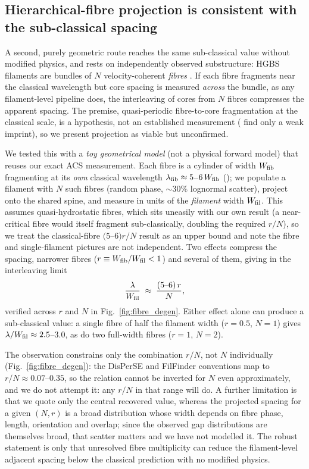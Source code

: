 \documentclass[usenatbib,twoside,twocolumn]{mnras}
\begin{document}
\subsection{Hierarchical-fibre projection is consistent with the sub-classical spacing}
\label{sec:fibre_projection}

A second, purely geometric route reaches the same sub-classical value without modified physics, and rests on independently observed substructure: HGBS filaments are bundles of $N$ velocity-coherent \emph{fibres} \citep{Hacar2013,Hacar2018,Yang2024}. If each fibre fragments near the classical wavelength but core spacing is measured \emph{across} the bundle, as any filament-level pipeline does, the interleaving of cores from $N$ fibres compresses the apparent spacing. The premise, quasi-periodic fibre-to-core fragmentation at the classical scale, is a hypothesis, not an established measurement (\citealt{Yang2024} find only a weak imprint), so we present projection as viable but unconfirmed.

We tested this with a \emph{toy geometrical model} (not a physical forward model) that reuses our exact ACS measurement. Each fibre is a cylinder of width $W_{\rm fib}$ fragmenting at its \emph{own} classical wavelength $\lambda_{\rm fib}\approx5$--$6\,W_{\rm fib}$ (\citealt{Fischera2012}); we populate a filament with $N$ such fibres (random phase, $\sim30\%$ lognormal scatter), project onto the shared spine, and measure in units of the \emph{filament} width $W_{\rm fil}$. This assumes quasi-hydrostatic fibres, which sits uneasily with our own result (a near-critical fibre would itself fragment sub-classically, doubling the required $r/N$), so we treat the classical-fibre $(5$--$6)r/N$ result as an upper bound and note the fibre and single-filament pictures are not independent. Two effects compress the spacing, narrower fibres ($r\equiv W_{\rm fib}/W_{\rm fil}<1$) and several of them, giving in the interleaving limit
\begin{equation}
\frac{\lambda}{W_{\rm fil}} \;\approx\; \frac{(5\text{--}6)\,r}{N},
\label{eq:fourrn}
\end{equation}
verified across $r$ and $N$ in Fig.~\ref{fig:fibre_degen}. Either effect alone can produce a sub-classical value: a single fibre of half the filament width ($r=0.5$, $N=1$) gives $\lambda/W_{\rm fil}\approx2.5$--$3.0$, as do two full-width fibres ($r=1$, $N=2$).

The observation constrains only the combination $r/N$, not $N$ individually (Fig.~\ref{fig:fibre_degen}): the DisPerSE and FilFinder conventions map to $r/N\approx0.07$--$0.35$, so the relation cannot be inverted for $N$ even approximately, and we do not attempt it: any $r/N$ in that range will do. A further limitation is that we quote only the central recovered value, whereas the projected spacing for a given $(N,r)$ is a broad distribution whose width depends on fibre phase, length, orientation and overlap; since the observed gap distributions are themselves broad, that scatter matters and we have not modelled it. The robust statement is only that unresolved fibre multiplicity can reduce the filament-level adjacent spacing below the classical prediction with no modified physics.
\end{document}

